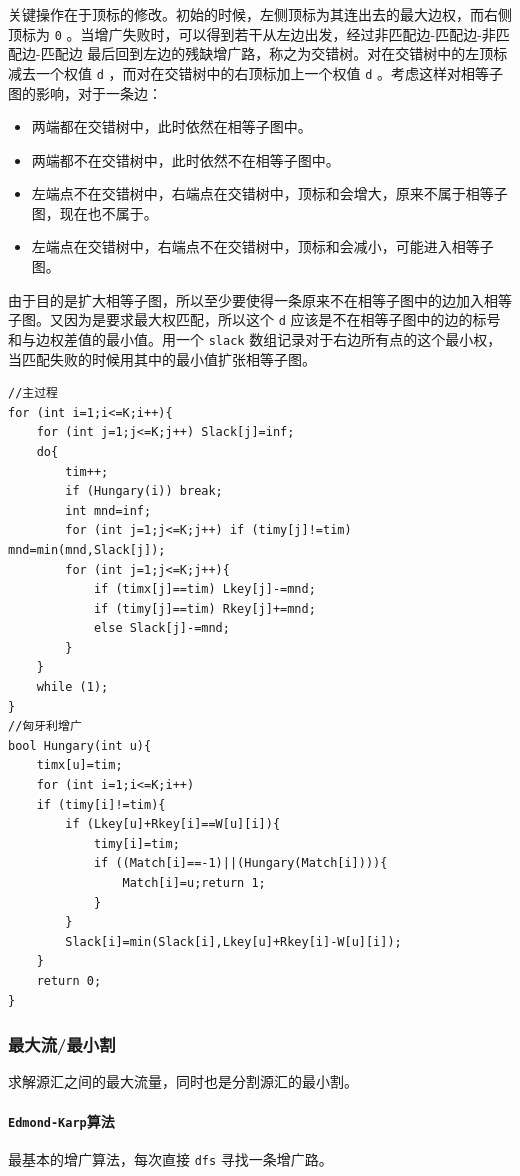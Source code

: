 \documentclass[UTF-8]{ctexart}
\begin{document}
	关键操作在于顶标的修改。初始的时候，左侧顶标为其连出去的最大边权，而右侧顶标为 \texttt{0} 。当增广失败时，可以得到若干从左边出发，经过非匹配边-匹配边-非匹配边-匹配边 最后回到左边的残缺增广路，称之为交错树。对在交错树中的左顶标减去一个权值 \texttt{d} ，而对在交错树中的右顶标加上一个权值 \texttt{d} 。考虑这样对相等子图的影响，对于一条边：
	\begin{itemize}
		\item 两端都在交错树中，此时依然在相等子图中。
		\item 两端都不在交错树中，此时依然不在相等子图中。
		\item 左端点不在交错树中，右端点在交错树中，顶标和会增大，原来不属于相等子图，现在也不属于。
		\item 左端点在交错树中，右端点不在交错树中，顶标和会减小，可能进入相等子图。
	\end{itemize}

	由于目的是扩大相等子图，所以至少要使得一条原来不在相等子图中的边加入相等子图。又因为是要求最大权匹配，所以这个 \texttt{d} 应该是不在相等子图中的边的标号和与边权差值的最小值。用一个 \texttt{slack} 数组记录对于右边所有点的这个最小权，当匹配失败的时候用其中的最小值扩张相等子图。
\begin{verbatim}
//主过程
for (int i=1;i<=K;i++){
    for (int j=1;j<=K;j++) Slack[j]=inf;
    do{
        tim++;
        if (Hungary(i)) break;
        int mnd=inf;
        for (int j=1;j<=K;j++) if (timy[j]!=tim) mnd=min(mnd,Slack[j]);
        for (int j=1;j<=K;j++){
            if (timx[j]==tim) Lkey[j]-=mnd;
            if (timy[j]==tim) Rkey[j]+=mnd;
            else Slack[j]-=mnd;
        }
    }
    while (1);
}
//匈牙利增广
bool Hungary(int u){
    timx[u]=tim;
    for (int i=1;i<=K;i++)
    if (timy[i]!=tim){
        if (Lkey[u]+Rkey[i]==W[u][i]){
            timy[i]=tim;
            if ((Match[i]==-1)||(Hungary(Match[i]))){
                Match[i]=u;return 1;
            }
        }
        Slack[i]=min(Slack[i],Lkey[u]+Rkey[i]-W[u][i]);
    }
    return 0;
}
\end{verbatim}
	\subsubsection{最大流/最小割}
	求解源汇之间的最大流量，同时也是分割源汇的最小割。
	\paragraph{\texttt{Edmond-Karp}算法} 最基本的增广算法，每次直接 \texttt{dfs} 寻找一条增广路。
\end{document}

